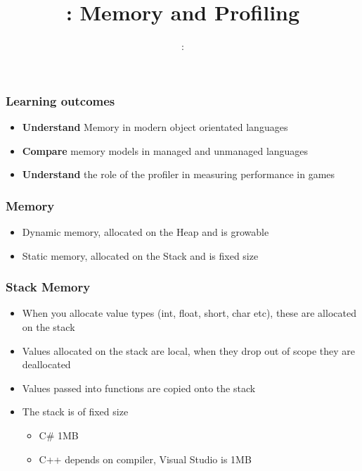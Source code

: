 \usepackage{../../beamerthemeFalmouthGamesAcademy}
\usepackage{multimedia}
\graphicspath{ {../../} }


\usepackage[normalem]{ulem}
\usepackage{wasysym}
\usepackage{listings}
\usepackage{pdfpages}

\usetikzlibrary{arrows,automata}




\title{\sessionnumber: Memory and Profiling}
\subtitle{\modulecode: \moduletitle}

\frame{\titlepage}

\begin{frame}
	\frametitle{Learning outcomes}
	\begin{itemize}
		\item \textbf{Understand} Memory in modern object orientated languages
		\item \textbf{Compare} memory models in managed and unmanaged languages
		\item \textbf{Understand} the role of the profiler in measuring performance in games
	\end{itemize}
\end{frame}

\begin{frame}
  \frametitle{Memory}
  \begin{itemize}
    \item Dynamic memory, allocated on the Heap and is growable
    \item Static memory, allocated on the Stack and is fixed size
  \end{itemize}
\end{frame}

\begin{frame}
  \frametitle{Stack Memory}
  \begin{itemize}
  	\item When you allocate value types (int, float, short, char etc), these are allocated on the stack
  	\item Values allocated on the stack are local, when they drop out of scope they are deallocated  
  	\item Values passed into functions are copied onto the stack
  	\item The stack is of fixed size
  	\begin{itemize}
  	\item C\# 1MB
  	\item C++ depends on compiler, Visual Studio is 1MB
  	\end{itemize}
  \end{itemize}
\end{frame}

